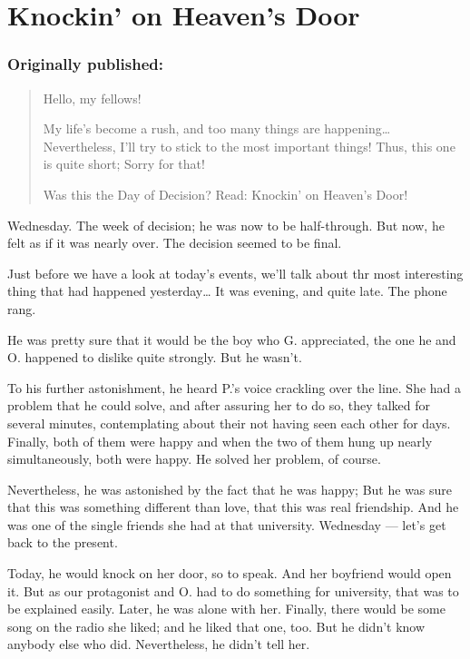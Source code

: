 \chapter{Knockin' on Heaven's Door}
\label{cha:knockin-heavens-door}
\subsection*{Originally published: }
\begin{quote}
Hello, my fellows!

My life's become a rush, and too many things are happening\dots{}
Nevertheless, I'll try to stick to the most important things!
Thus, this one is quite short; Sorry for that!

Was this the Day of Decision? Read: Knockin' on Heaven's Door!
\end{quote}

Wednesday. 
The week of decision; he was now to be half-through. 
But now, he felt as if it was nearly over. 
The decision seemed to be final.

Just before we have a look at today's events, we'll talk about thr most interesting thing that had happened yesterday\dots{}
It was evening, and quite late. 
The phone rang.

He was pretty sure that it would be the boy who G. appreciated, the one he and O. happened to dislike quite strongly. 
But he wasn't.

To his further astonishment, he heard P.'s voice crackling over the line. 
She had a problem that he could solve, and after assuring her to do so, they talked for several minutes, contemplating about their not having seen each other for days. 
Finally, both of them were happy and when the two of them hung up nearly simultaneously, both were happy. 
He solved her problem, of course.

Nevertheless, he was astonished by the fact that he was happy; But he was sure that this was something different than love, that this was real friendship. 
And he was one of the single friends she had at that university. 
Wednesday --- let's get back to the present.

Today, he would knock on her door, so to speak. 
And her boyfriend would open it. 
But as our protagonist and O. had to do something for university, that was to be explained easily. 
Later, he was alone with her. Finally, there would be some song on the radio she liked; and he liked that one, too. 
But he didn't know anybody else who did. 
Nevertheless, he didn't tell her.

